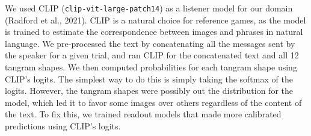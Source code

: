 \documentclass[10pt, letterpaper]{article}
\begin{document}
We used CLIP (\texttt{clip-vit-large-patch14}) as a listener model for
our domain (Radford et al., 2021). CLIP is a natural choice for
reference games, as the model is trained to estimate the correspondence
between images and phrases in natural language. We pre-processed the
text by concatenating all the messages sent by the speaker for a given
trial, and ran CLIP for the concatenated text and all 12 tangram shapes.
We then computed probabilities for each tangram shape using CLIP's
logits. The simplest way to do this is simply taking the softmax of the
logits. However, the tangram shapes were possibly out the distribution
for the model, which led it to favor some images over others regardless
of the content of the text. To fix this, we trained readout models that
made more calibrated predictions using CLIP's logits.
\end{document}
